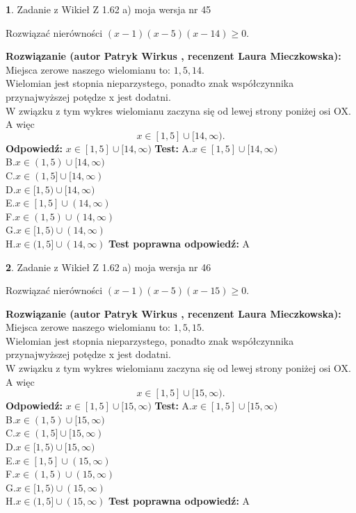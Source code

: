 \documentclass[12pt, a4paper]{article}
\theoremstyle{definition} %
\newtheorem{zad}{}
\newcommand{\zadStart}[1]{\begin{zad}#1\newline}
\newcommand{\zadStop}{\end{zad}}
\newcommand{\rozwStart}[2]{\noindent \textbf{Rozwiązanie (autor #1 , recenzent #2): }\newline}
\newcommand{\rozwStop}{\newline}
\newcommand{\odpStart}{\noindent \textbf{Odpowiedź:}\newline}
\newcommand{\odpStop}{\newline}
\newcommand{\testStart}{\noindent \textbf{Test:}\newline}
\newcommand{\testStop}{\newline}
\newcommand{\kluczStart}{\noindent \textbf{Test poprawna odpowiedź:}\newline}
\newcommand{\kluczStop}{\newline}
\begin{document}
\zadStart{Zadanie z Wikieł Z 1.62 a) moja wersja nr 45}

Rozwiązać nierówności $(x-1)(x-5)(x-14)\ge0$.
\zadStop
\rozwStart{Patryk Wirkus}{Laura Mieczkowska}
Miejsca zerowe naszego wielomianu to: $1, 5, 14$.\\
Wielomian jest stopnia nieparzystego, ponadto znak współczynnika przy\linebreak najwyższej potędze x jest dodatni.\\ W związku z tym wykres wielomianu zaczyna się od lewej strony poniżej osi OX. A więc $$x \in [1,5] \cup [14,\infty).$$
\rozwStop
\odpStart
$x \in [1,5] \cup [14,\infty)$
\odpStop
\testStart
A.$x \in [1,5] \cup [14,\infty)$\\
B.$x \in (1,5) \cup [14,\infty)$\\
C.$x \in (1,5] \cup [14,\infty)$\\
D.$x \in [1,5) \cup [14,\infty)$\\
E.$x \in [1,5] \cup (14,\infty)$\\
F.$x \in (1,5) \cup (14,\infty)$\\
G.$x \in [1,5) \cup (14,\infty)$\\
H.$x \in (1,5] \cup (14,\infty)$
\testStop
\kluczStart
A
\kluczStop



\zadStart{Zadanie z Wikieł Z 1.62 a) moja wersja nr 46}

Rozwiązać nierówności $(x-1)(x-5)(x-15)\ge0$.
\zadStop
\rozwStart{Patryk Wirkus}{Laura Mieczkowska}
Miejsca zerowe naszego wielomianu to: $1, 5, 15$.\\
Wielomian jest stopnia nieparzystego, ponadto znak współczynnika przy\linebreak najwyższej potędze x jest dodatni.\\ W związku z tym wykres wielomianu zaczyna się od lewej strony poniżej osi OX. A więc $$x \in [1,5] \cup [15,\infty).$$
\rozwStop
\odpStart
$x \in [1,5] \cup [15,\infty)$
\odpStop
\testStart
A.$x \in [1,5] \cup [15,\infty)$\\
B.$x \in (1,5) \cup [15,\infty)$\\
C.$x \in (1,5] \cup [15,\infty)$\\
D.$x \in [1,5) \cup [15,\infty)$\\
E.$x \in [1,5] \cup (15,\infty)$\\
F.$x \in (1,5) \cup (15,\infty)$\\
G.$x \in [1,5) \cup (15,\infty)$\\
H.$x \in (1,5] \cup (15,\infty)$
\testStop
\kluczStart
A
\kluczStop
\end{document}

